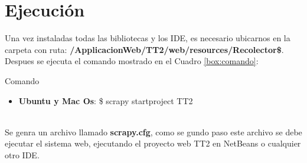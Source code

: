 \section{Ejecución}

Una vez instaladas todas las bibliotecas y los IDE, es necesario ubicarnos en la carpeta con ruta: \textbf{/ApplicacionWeb/TT2/web/resources/Recolector\$}. Despues se ejecuta el comando mostrado en el Cuadro \ref{box:comando}:\\

\begin{mygraybox}[label={box:comando}]{Comando} 
\begin{itemize}
	\item \textbf{Ubuntu y Mac Os}: \$ scrapy startproject TT2
\end{itemize}
\end{mygraybox}
\ \\
Se genra un archivo llamado \textbf{scrapy.cfg}, como se gundo paso este archivo se debe ejecutar el sistema web, ejecutando el proyecto web TT2 en NetBeans o cualquier otro IDE.
